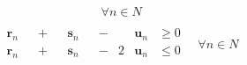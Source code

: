\documentclass{beamer}
\begin{document}
\begin{frame}
\begin{itemize}
\begin{equation}
\begin{split}
\begin{alignedat}{2}
                    \end{alignedat}
                \quad \forall n \in N
            \end{split}
        \end{equation}
        \begin{equation}
            \begin{split}
                \begin{alignedat}{8}
                    &&\boldsymbol{r}_{n} && {}+{} &&\boldsymbol{s}_{n} && {}-{} 
                    &&\boldsymbol{u}_{n} &\ge 0\\
                    &&\boldsymbol{r}_{n} && {}+{} &&\boldsymbol{s}_{n} && {}-{} 
                    &2&\boldsymbol{u}_{n} &\le 0\\
                \end{alignedat}
                \quad \forall n \in N
            \end{split}
        \end{equation}    
    \end{itemize}
\end{frame}
\end{document}

